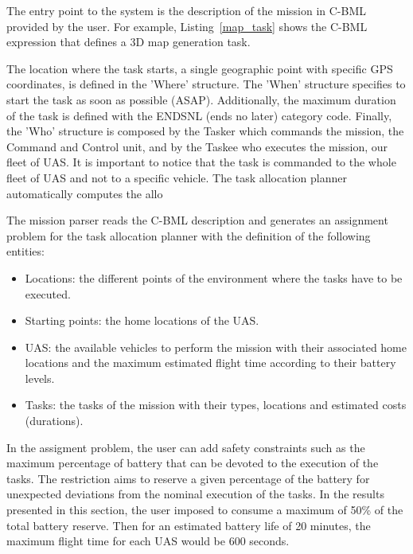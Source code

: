 \documentclass[twocolumn]{svjour3}          %
\begin{document}
The entry point to the system is the description of the mission in C-BML provided by the user. For example, Listing~\ref{map_task} shows the C-BML expression that defines a 3D map generation task. 



The location where the task starts, a single geographic point with specific GPS coordinates, is defined in the 'Where' structure. The 'When' structure specifies to start the task as soon as possible (ASAP). Additionally, the maximum duration of the task is defined with the ENDSNL (ends no later) category code. Finally, the 'Who' structure is composed by the Tasker which commands the mission, the Command and Control unit, and by the Taskee who executes the mission, our fleet of UAS. It is important to notice that the task is commanded to the whole fleet of UAS and not to a specific vehicle. The task allocation planner automatically computes the allo

The mission parser reads the C-BML description and generates an assignment problem for the task allocation planner with the definition of the following entities: 

\begin{itemize}
  \item Locations: the different points of the environment where the tasks have to be executed.
  \item Starting points: the home locations of the UAS.
  \item UAS: the available vehicles to perform the mission with their associated home locations and the maximum estimated flight time according to their battery levels.
  \item Tasks: the tasks of the mission with their types, locations and estimated costs (durations).
\end{itemize}

In the assigment problem, the user can add safety constraints such as the maximum percentage of battery that can be devoted to the execution of the tasks. The restriction aims to reserve a given percentage of the battery for unexpected deviations from the nominal execution of the tasks. In the results presented in this section, the user imposed to consume a maximum of 50\% of the total battery reserve. Then for an estimated battery life of 20 minutes, the maximum flight time for each UAS would be 600 seconds.
\end{document}

